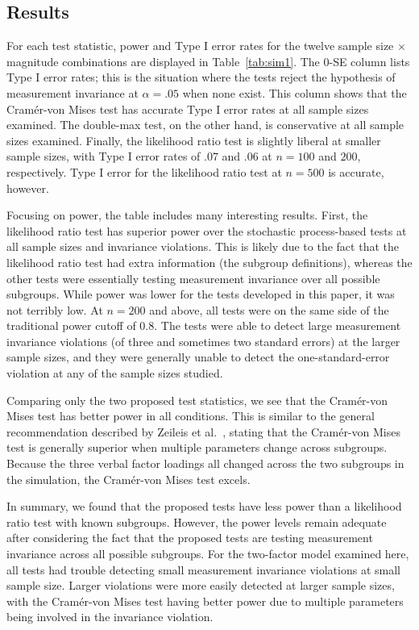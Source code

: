 \documentclass[man]{apa}
\begin{document}
\subsection{Results}
For each test statistic, power and Type I error rates for the twelve
sample size $\times$ magnitude combinations are displayed in
Table~\ref{tab:sim1}.  The 0-SE column lists Type I error rates; this
is the situation where the tests reject the hypothesis of measurement
invariance at $\alpha=.05$ when none exist.  This column 
shows that the Cram\'{e}r-von Mises test has accurate Type I error
rates at all sample sizes examined.
The double-max test, on the other hand, is conservative at
all sample sizes examined.  Finally, the likelihood ratio test is
slightly liberal at smaller sample sizes, with Type I error rates of
.07 and .06 at $n=100$ and $200$, respectively.  Type I error for the
likelihood ratio test at $n=500$ is accurate, however.

Focusing on power, the table includes many interesting results.
First, the likelihood ratio test has superior power over the stochastic
process-based tests at all sample sizes and invariance violations.
This is likely due to the fact that the likelihood ratio test had
extra information (the subgroup definitions), whereas the other tests
were essentially testing measurement invariance over all possible
subgroups.  While power was lower for the tests developed in this
paper, it was not terribly low.  At $n=200$ and above, all tests were
on the same side of the traditional power cutoff of 0.8.  The tests
were able to detect large measurement invariance violations (of three
and sometimes two standard errors) at the larger sample sizes, and
they were generally unable to detect the one-standard-error violation
at any of the sample sizes studied.

Comparing only the two proposed test statistics, we see that the
Cram\'{e}r-von Mises test has better power in all conditions.  This is
similar to the general recommendation described by Zeileis et al.\
\citeyear{ZeiSha10}, stating that the Cram\'{e}r-von Mises test
is generally superior when multiple parameters change across
subgroups.  Because the three verbal factor loadings all changed
across the two subgroups in the simulation, the Cram\'{e}r-von Mises
test excels.

In summary, we found that the proposed tests have less power than a
likelihood ratio test with known subgroups.  However, the power levels
remain adequate after considering the fact that the proposed tests are
testing measurement invariance across all possible subgroups.  For the
two-factor model examined here, all tests had trouble detecting small
measurement invariance violations at small sample size.  Larger
violations were more easily detected at larger sample sizes, with the
Cram\'{e}r-von Mises test having better power due to multiple
parameters being involved in the invariance violation.
\end{document}
